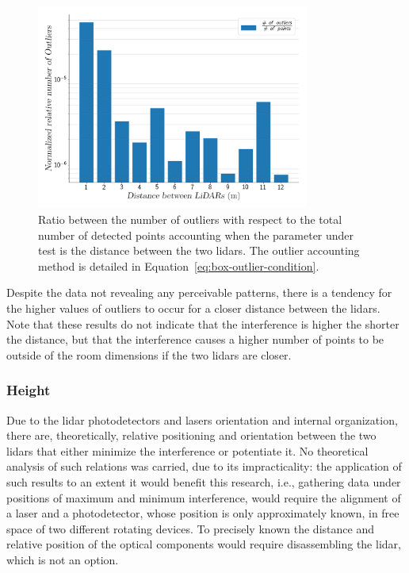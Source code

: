 \begin{figure}[!ht]
\centering
\includegraphics[width=0.8\textwidth]{img/lidar-interference/box-filtering/interference-box-filter-outliers-distance.png}
\caption[Relative number of outliers when the distance between the \acsp{lidar} is varied on \acs{irislab}.]{Ratio between the number of outliers with respect to the total number of detected points accounting when the parameter under test is the distance between the two \acp{lidar}. The outlier accounting method is detailed in Equation~\eqref{eq:box-outlier-condition}.}
\label{fig:box-filter-outliers-distance}
\end{figure}

Despite the data not revealing any perceivable patterns, there is a tendency for the higher values of outliers to occur for a closer distance between the \acp{lidar}. Note that these results do not indicate that the interference is higher the shorter the distance, but that the interference causes a higher number of points to be outside of the room dimensions if the two \acp{lidar} are closer. 

\subsubsection{Height}
Due to the \ac{lidar} photodetectors and lasers orientation and internal organization, there are, theoretically, relative positioning and orientation between the two \acp{lidar} that either minimize the interference or potentiate it. No theoretical analysis of such relations was carried, due to its impracticality: the application of such results to an extent it would benefit this research, i.e., gathering data under positions of maximum and minimum interference, would require the alignment of a laser and a photodetector, whose position is only approximately known, in free space of two different rotating devices. To precisely known the distance and relative position of the optical components would require disassembling the \ac{lidar}, which is not an option.

